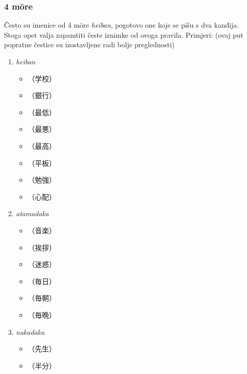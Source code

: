 \subsubsection*{4 m\=ore}
Često su imenice od 4 m\=ore \textit{heiban}, pogotovo one koje se pišu s dva kanđija.
Stoga opet valja zapamtiti česte iznimke od ovoga pravila.
Primjeri: (ovaj put popratne čestice su izostavljene radi bolje preglednosti)
\begin{enumerate}
	\item \textit{heiban}
	\begin{multicols}{3}
		\begin{itemize}
			\item {}（学校）
			\item {}（銀行）
			\item {}（最低）
			\item {}（最悪）
			\item {}（最高）
			\item {}（平板）
			\item {}（勉強）
			\item {}（心配）
		\end{itemize}
	\end{multicols}
	\item \textit{atamadaka}
	\begin{multicols}{3}
		\begin{itemize}
			\item {}（音楽）
			\item {}（挨拶）
			\item {}（迷惑）
			\item {}（毎日）
			\item {}（毎朝）
			\item {}（毎晩）
		\end{itemize}
	\end{multicols} %
	\item \textit{nakadaka}
	\begin{multicols}{3}
		\begin{itemize}
			\item {}（先生）
			\item {}（半分）

\end{itemize}
\end{multicols}
\end{enumerate}
